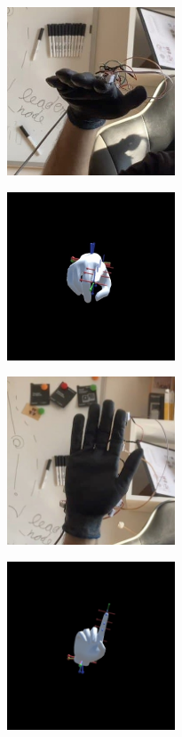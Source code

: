\begin{figure}
 \centering
 \begin{subfigure}[ht]{0.3\textwidth}
     \centering
     \includegraphics[width=5cm,height=5cm]{immagini/confronto/1.jpg}
     \caption{}
 \end{subfigure}
 \begin{subfigure}[ht]{0.3\textwidth}
     \includegraphics[width=5cm,height=5cm]{immagini/confronto/1_sym.jpg}
     \caption{}
 \end{subfigure}
 \caption{}
\end{figure}

\begin{figure}
 \centering
 \begin{subfigure}[ht]{0.3\textwidth}
     \centering
     \includegraphics[width=5cm,height=5cm]{immagini/confronto/2_real.jpg}
     \caption{}
 \end{subfigure}
 \begin{subfigure}[ht]{0.3\textwidth}
     \includegraphics[width=5cm,height=5cm]{immagini/confronto/2_sym.jpg}
     \caption{}
 \end{subfigure}
 \caption{}
\end{figure}

